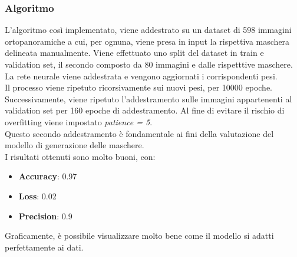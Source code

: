 \documentclass[12pt,a4paper,openright,twoside]{book}
\begin{document}
\subsubsection{Algoritmo}
L'algoritmo così implementato, viene addestrato su un dataset di 598 immagini ortopanoramiche a cui, per ognuna, viene presa in input la rispettiva maschera delineata manualmente. Viene effettuato uno split del dataset in train e validation set, il secondo composto da 80 immagini e dalle rispetttive maschere.\\
La rete neurale viene addestrata e vengono aggiornati i corrispondenti pesi.\\
Il processo viene ripetuto ricorsivamente sui nuovi pesi, per 10000 epoche. \\
Successivamente, viene ripetuto l'addestramento sulle immagini appartenenti al validation set per 160 epoche di addestramento. Al fine di evitare il rischio di overfitting viene impostato {\itshape patience = 5}.\\

Questo secondo addestramento è fondamentale ai fini della valutazione del modello di generazione delle maschere.\\
I risultati ottenuti sono molto buoni, con:
\begin{itemize}
\item \textbf{Accuracy}: 0.97
\item \textbf{Loss}: 0.02
\item \textbf{Precision}: 0.9
\end{itemize}

Graficamente, è possibile visualizzare molto bene come il modello si adatti perfettamente ai dati.
\end{document}
